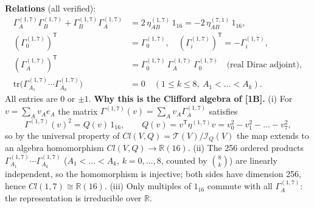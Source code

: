 \documentclass[10pt,a4paper]{article}
\begin{document}
\textbf{Relations} (all verified):
\begin{align*}
\Gamma^{(1,7)}_A\Gamma^{(1,7)}_B+\Gamma^{(1,7)}_B\Gamma^{(1,7)}_A&=2\,\eta^{(1,7)}_{AB}\,1_{16}=-2\,\eta^{(7,1)}_{AB}\,1_{16}, \\
(\Gamma^{(1,7)}_0)^{\mathsf T}&=\Gamma^{(1,7)}_0,\quad (\Gamma^{(1,7)}_i)^{\mathsf T}=-\Gamma^{(1,7)}_i, \\
(\Gamma^{(1,7)}_A)^{\mathsf T}&=\Gamma^{(1,7)}_0\,\Gamma^{(1,7)}_A\,\Gamma^{(1,7)}_0\quad\text{(real Dirac adjoint)}, \\
\mathrm{tr}\big(\Gamma^{(1,7)}_{A_1}\cdots\Gamma^{(1,7)}_{A_k}\big)&=0\quad(1\le k\le8,\ A_1<\dots<A_k).
\end{align*}
All entries are $0$ or $\pm1$. \textbf{Why this is the Clifford algebra of [1B].} (i) For $v=\sum_Av_Ae_A$ the matrix $\Gamma^{(1,7)}(v)=\sum_Av_A\Gamma^{(1,7)}_A$ satisfies
\begin{equation*}
\Gamma^{(1,7)}(v)^2=Q(v)\,1_{16},\qquad Q(v)=v^{\mathsf T}\eta^{(1,7)}v=v_0^2-v_1^2-\dots-v_7^2,
\end{equation*}
so by the universal property of $Cl(V,Q)=\mathcal T(V)/\mathcal I_Q(V)$ the map extends to an algebra homomorphism $Cl(V,Q)\to\mathbb R(16)$. (ii) The 256 ordered products $\Gamma^{(1,7)}_{A_1}\cdots\Gamma^{(1,7)}_{A_k}$ ($A_1<\dots<A_k$, $k=0,\dots,8$, counted by $\binom8k$) are linearly independent, so the homomorphism is injective; both sides have dimension 256, hence $Cl(1,7)\cong\mathbb R(16)$. (iii) Only multiples of $1_{16}$ commute with all $\Gamma^{(1,7)}_A$: the representation is irreducible over $\mathbb R$.
\end{document}
